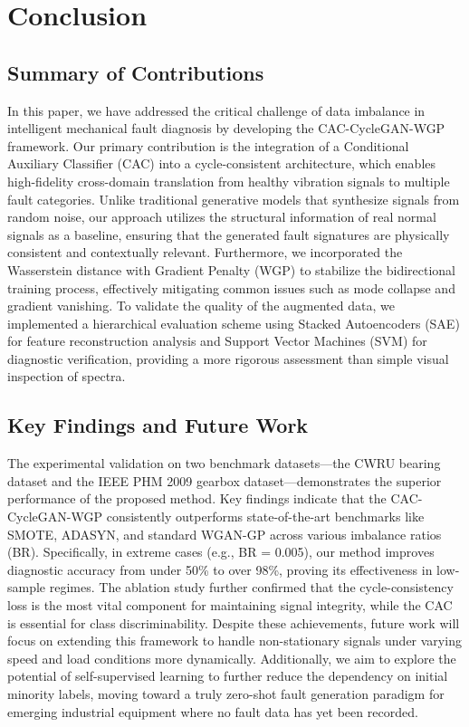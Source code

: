 \section{Conclusion}
\label{sec:conclusion}

\subsection{Summary of Contributions}
In this paper, we have addressed the critical challenge of data imbalance in intelligent mechanical fault diagnosis by developing the CAC-CycleGAN-WGP framework. Our primary contribution is the integration of a Conditional Auxiliary Classifier (CAC) into a cycle-consistent architecture, which enables high-fidelity cross-domain translation from healthy vibration signals to multiple fault categories. Unlike traditional generative models that synthesize signals from random noise, our approach utilizes the structural information of real normal signals as a baseline, ensuring that the generated fault signatures are physically consistent and contextually relevant. Furthermore, we incorporated the Wasserstein distance with Gradient Penalty (WGP) to stabilize the bidirectional training process, effectively mitigating common issues such as mode collapse and gradient vanishing. To validate the quality of the augmented data, we implemented a hierarchical evaluation scheme using Stacked Autoencoders (SAE) for feature reconstruction analysis and Support Vector Machines (SVM) for diagnostic verification, providing a more rigorous assessment than simple visual inspection of spectra.

\subsection{Key Findings and Future Work}
The experimental validation on two benchmark datasets—the CWRU bearing dataset and the IEEE PHM 2009 gearbox dataset—demonstrates the superior performance of the proposed method. Key findings indicate that the CAC-CycleGAN-WGP consistently outperforms state-of-the-art benchmarks like SMOTE, ADASYN, and standard WGAN-GP across various imbalance ratios (BR). Specifically, in extreme cases (e.g., BR = 0.005), our method improves diagnostic accuracy from under 50\% to over 98\%, proving its effectiveness in low-sample regimes. The ablation study further confirmed that the cycle-consistency loss is the most vital component for maintaining signal integrity, while the CAC is essential for class discriminability. Despite these achievements, future work will focus on extending this framework to handle non-stationary signals under varying speed and load conditions more dynamically. Additionally, we aim to explore the potential of self-supervised learning to further reduce the dependency on initial minority labels, moving toward a truly zero-shot fault generation paradigm for emerging industrial equipment where no fault data has yet been recorded.
